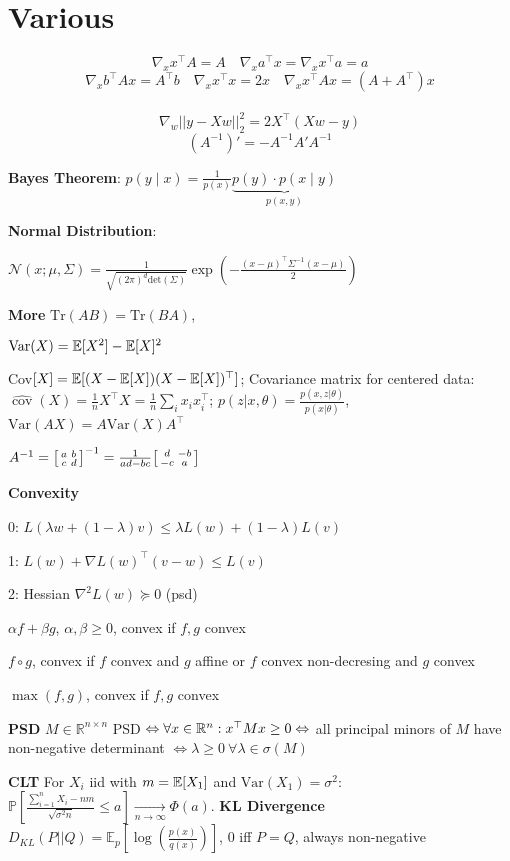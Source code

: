 \section*{Various}

$$\nabla_x x^\top A = A \quad \nabla_x a^\top x = \nabla_x x^\top a = a$$
$$\nabla_x b^\top A x = A^\top b \quad \nabla_x x^\top x = 2x \quad \nabla_x x^\top A x = (A + A^\top)x$$\\[-20pt]
$$\nabla_w || y-Xw||_2^2 = 2X^\top(Xw-y)$$
$$(A^{-1})' = -A^{-1} A' A^{-1}$$

\textbf{Bayes Theorem}: $p(y \; | \; x) = \frac{1}{p(x)} \underbrace{p(y) \cdot p(x \; | \; y)}_{p(x,y)}$

\textbf{Normal Distribution}:

$\mathcal{N}(x; \mu, \Sigma) = \frac{1}{\sqrt{(2 \pi)^d \text{det}(\Sigma)}} \exp(-\frac{(x - \mu)^\top \Sigma^{-1} (x-\mu)}{2})$

\textbf{More} $\text{Tr}(AB) = \text{Tr}(BA)$, 

$\text{Var}(X) = \mathbb{E}[X^2] - \mathbb{E}[X]^2$
 
Cov$[X] = \mathbb{E}[(X- \mathbb{E}[X])(X- \mathbb{E}[X])^\top]$;
Covariance matrix for centered data: $
\widehat{\operatorname{cov}}(X)=\frac{1}{n}X^\top X=\frac{1}{n}\sum_i x_ix_i^\top
$; $p(z|x,\theta) = \frac{p(x,z|\theta)}{p(x | \theta)}$, $\text{Var}(AX) = A \text{Var}(X) A^\top$


$A^{-1}=
\begin{bsmallmatrix}
a&b \\ 
c&d
\end{bsmallmatrix}^{-1}=\frac{1}{ad-bc}
\begin{bsmallmatrix}
d&-b \\ 
-c&a
\end{bsmallmatrix}
$

\textbf{Convexity}

0: $L(\lambda w + (1 - \lambda)v) \leq \lambda L (w) + (1- \lambda) L(v)$

1: $L(w) + \nabla L(w)^\top (v - w) \leq L(v)$

2: Hessian $\nabla^2 L (w) \succcurlyeq 0$ (psd)

\begin{rowlist}
	\item $\alpha f + \beta g$, $\alpha, \beta \geq 0$, convex if $f, g$ convex
	\item $f \circ g$, convex if $f$ convex and $g$ affine or $f$ convex non-decresing and $g$ convex
	\item $\max(f, g)$, convex if $f,g$ convex
\end{rowlist}

\textbf{PSD}
$M \in \mathbb{R}^{n\times n}$ PSD $\Leftrightarrow \forall x \in \mathbb{R}^n: x^\top Mx \geq 0 \\
\Leftrightarrow$ all principal minors of $M$ have non-negative determinant $\Leftrightarrow \lambda \geq 0 \ \forall \lambda\in\sigma(M)$

\textbf{CLT} For $X_i$ iid with $m = \mathbb{E}[X_1]$ and $\text{Var}(X_1) = \sigma^2$: $\mathbb{P}\left[\frac{\sum_{i=1}^n X_i - n m}{\sqrt{\sigma^2 n}} \leq a\right] \xrightarrow[n \to \infty]{} \Phi(a)$.
\textbf{KL Divergence} $D_{KL}(P||Q) = \mathbb{E}_p[\log(\frac{p(x)}{q(x)})]$, 0 iff $P = Q$, always non-negative
